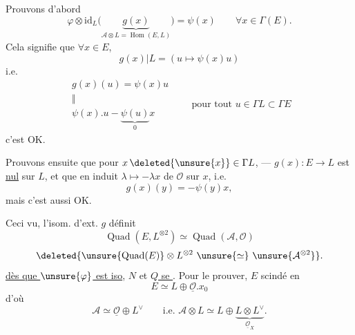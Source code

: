 
Prouvons d'abord
\[
\varphi\otimes\mathrm{id}_L\bigl(\underbrace{g(x)}_{\mathcal A\otimes L=\operatorname{Hom}(E,L)}\bigr)=\psi(x)\qquad \forall x\in\Gamma(E).
\]
Cela signifie que $\forall x\in E$,
\[
g(x)|L=(u\mapsto\psi(x)u)
\]
 i.e.
\[
\begin{array}{c}
g(x)(u)=\psi(x)u\\[-2pt]
\Vert\\[-2pt]
\psi(x).u-\underbrace{\psi(u)}_{0}x
\end{array}
\qquad\text{pour tout }u\in\Gamma L\subset\Gamma E
\]
c'est OK.

Prouvons ensuite que pour $x\,\deleted{\unsure{x}}\in\Gamma L$, ---
$g(x):E\longrightarrow L$ est \uline{nul} sur $L$, et que 
en  induit $\lambda\mapsto-\lambda x$ de $\mathcal O$ sur $x$,
i.e.
\[
g(x)(y)=-\psi(y)x,
\]
mais c'est aussi OK.

Ceci vu, l'isom. d'ext. $g$ définit
\[
\operatorname{Quad}(E,L^{\otimes2})\simeq\operatorname{Quad}(\mathcal A,\mathcal O)
\]
\[
\deleted{\unsure{\operatorname{Quad}(E)}\otimes L^{\otimes2}\ \unsure{\simeq}\ \unsure{\mathcal A^{\otimes2}}}.
\]
\uline{dès que $\unsure{\varphi}$ est iso}, \uline{$N$} et \uline{$Q$ se }.
Pour le prouver,  $E$ scindé en
\[
E\simeq L\oplus\underline{\mathcal O}.x_0
\]
d'où
\[
\mathcal A\simeq\underline{\mathcal O}\oplus L^\vee
\qquad\text{i.e. }\mathcal A\otimes L\simeq L\oplus\underbrace{L\otimes L^\vee}_{\underline{\mathcal O}_X}.
\]

